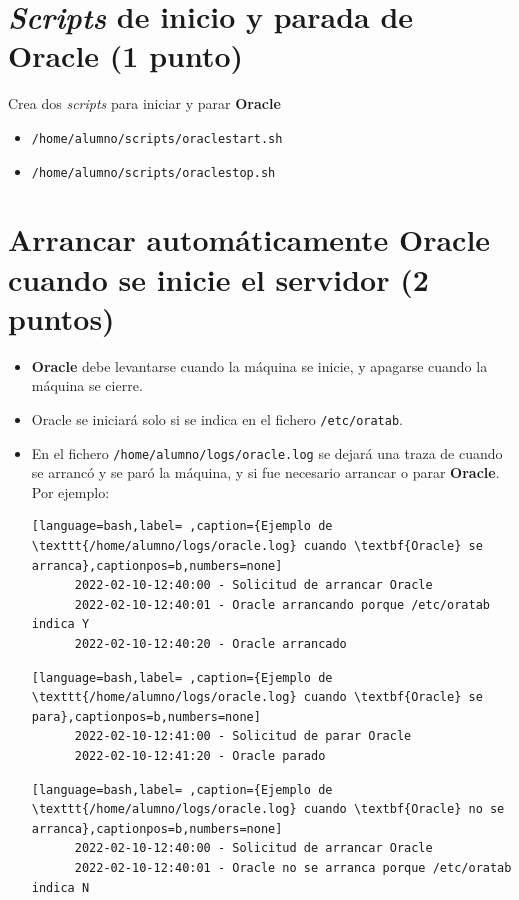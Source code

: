 \documentclass[a4paper]{article}
\begin{document}
\section{\emph{Scripts} de inicio y parada de \textbf{Oracle} (1 punto)}
\label{sec:org0000000}

Crea dos \emph{scripts} para iniciar y parar \textbf{Oracle}
\begin{itemize}
\item \texttt{/home/alumno/scripts/oraclestart.sh}
\item \texttt{/home/alumno/scripts/oraclestop.sh}
\end{itemize}


\section{Arrancar automáticamente \textbf{Oracle} cuando se inicie el servidor (2 puntos)}
\label{sec:org0000003}


\begin{itemize}
\item \textbf{Oracle} debe levantarse cuando la máquina se inicie, y apagarse cuando la máquina se cierre.
\item Oracle se iniciará solo si se indica en el fichero \texttt{/etc/oratab}.

\item En el fichero \texttt{/home/alumno/logs/oracle.log} se dejará una traza de cuando se arrancó y se paró la máquina, y si fue necesario arrancar o parar \textbf{Oracle}. Por ejemplo:

\begin{lstlisting}[language=bash,label= ,caption={Ejemplo de \texttt{/home/alumno/logs/oracle.log} cuando \textbf{Oracle} se arranca},captionpos=b,numbers=none]
      2022-02-10-12:40:00 - Solicitud de arrancar Oracle
      2022-02-10-12:40:01 - Oracle arrancando porque /etc/oratab indica Y
      2022-02-10-12:40:20 - Oracle arrancado
\end{lstlisting}

\begin{lstlisting}[language=bash,label= ,caption={Ejemplo de \texttt{/home/alumno/logs/oracle.log} cuando \textbf{Oracle} se para},captionpos=b,numbers=none]
      2022-02-10-12:41:00 - Solicitud de parar Oracle
      2022-02-10-12:41:20 - Oracle parado
\end{lstlisting}

\begin{lstlisting}[language=bash,label= ,caption={Ejemplo de \texttt{/home/alumno/logs/oracle.log} cuando \textbf{Oracle} no se arranca},captionpos=b,numbers=none]
      2022-02-10-12:40:00 - Solicitud de arrancar Oracle
      2022-02-10-12:40:01 - Oracle no se arranca porque /etc/oratab indica N
\end{lstlisting}
\end{itemize}
\end{document}
